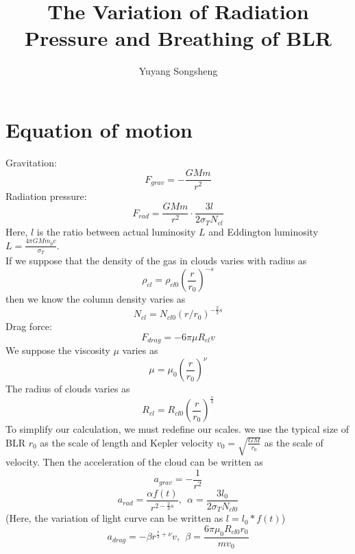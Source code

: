 \documentclass{article}
\author{Yuyang Songsheng}
\title{The Variation of Radiation Pressure and Breathing of BLR}
\begin{document}
\maketitle
\section{Equation of motion}
Gravitation:
\begin{equation}
F_{grav} = -\frac{GMm}{r^2}
\end{equation}
Radiation pressure:
\begin{equation}
F_{rad} = \frac{GMm}{r^2} \cdot \frac{3l}{2\sigma_T N_{cl}}
\end{equation}
Here, $l$ is the ratio between actual luminosity $L$ and Eddington luminosity $L=\frac{4\pi GMm_pc}{\sigma_T}$.\\
If we suppose that the density of the gas in clouds varies with radius as
\begin{equation}
\rho_{cl} = \rho_{cl0} (\frac{r}{r_0})^{-s}
\end{equation}
then we know the column density varies as
\begin{equation}
N_{cl} = N_{cl0} (r/r_0)^{-\frac{2}{3}s}
\end{equation}
Drag force:
\begin{equation}
F_{drag} = -6\pi \mu R_{cl} v
\end{equation}
We suppose the viscosity $\mu$ varies as
\begin{equation}
\mu = \mu_0 (\frac{r}{r_0})^{\nu}
\end{equation}
The radius of clouds varies as 
\begin{equation}
R_{cl} = R_{cl0} (\frac{r}{r_0})^{\frac{s}{3}}
\end{equation}
To simplify our calculation, we must redefine our scales. we use the typical size of BLR $r_0$ as the scale of length and Kepler velocity $v_{0} = \sqrt{\frac{GM}{r_0}}$ as the scale of velocity. Then the acceleration of the cloud can be written as
\begin{equation}
a_{grav} = - \frac{1}{r^2}
\end{equation}
\begin{equation}
a_{rad} = \frac{\alpha f(t)}{r^{2-\frac{2}{3}s}}, \ \ \alpha = \frac{3l_0}{2\sigma_T N_{cl0}}
\end{equation}
(Here, the variation of light curve can be written as $l = l_0 *f(t)$)
\begin{equation}
a_{drag} = -\beta r^{\frac{s}{3}+\nu} v,\ \ \beta = \frac{6\pi \mu_0 R_{cl0} r_0}{m v_0}
\end{equation}
\end{document}
